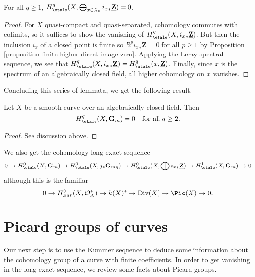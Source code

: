 \begin{lemma}
\label{lemma-cohomology-istar-Z}
For all $q \geq 1$, $H_\etale^q(X, \bigoplus_{x \in X_0} {i_x}_*
\underline{\mathbf{Z}}) = 0$.
\end{lemma}

\begin{proof}
For $X$ quasi-compact and quasi-separated, cohomology commutes with colimits,
so it suffices to show the vanishing of $H_\etale^q(X, {i_x}_*
\underline{\mathbf{Z}})$. But then the inclusion $i_x$ of a closed point is
finite so $R^p {i_x}_* \underline{\mathbf{Z}} = 0$ for all $p \geq 1$ by
Proposition \ref{proposition-finite-higher-direct-image-zero}.
Applying the Leray spectral sequence, we see that
$H_\etale^q(X, {i_x}_* \underline{\mathbf{Z}}) =
H_\etale^q(x, \underline{\mathbf{Z}})$.
Finally, since $x$ is the spectrum of an
algebraically closed field, all higher cohomology on $x$ vanishes.
\end{proof}

\noindent
Concluding this series of lemmata, we get the following result.

\begin{theorem}
\label{theorem-vanishing-cohomology-Gm-curve}
Let $X$ be a smooth curve over an algebraically closed field. Then
$$
H_\etale^q(X, \mathbf{G}_m) = 0 \ \ \text{ for all } q \geq 2.
$$
\end{theorem}

\begin{proof}
See discussion above.
\end{proof}

\noindent
We also get the cohomology long exact sequence
$$
0 \to
H_\etale^0(X, \mathbf{G}_m) \to
H_\etale^0(X, j_*\mathbf{G}_{m\eta}) \to
H_\etale^0(X, \bigoplus {i_x}_*\underline{\mathbf{Z}}) \to
H_\etale^1(X, \mathbf{G}_m) \to 0
$$
although this is the familiar
$$
0 \to H_{Zar}^0(X, \mathcal{O}_X^*) \to k(X)^* \to \text{Div}(X)
\to \Pic(X) \to 0.
$$





\section{Picard groups of curves}
\label{section-pic-curves}

\noindent
Our next step is to use the Kummer sequence to deduce some information
about the cohomology group of a curve with finite coefficients. In order
to get vanishing in the long exact sequence, we review some facts about
Picard groups.

